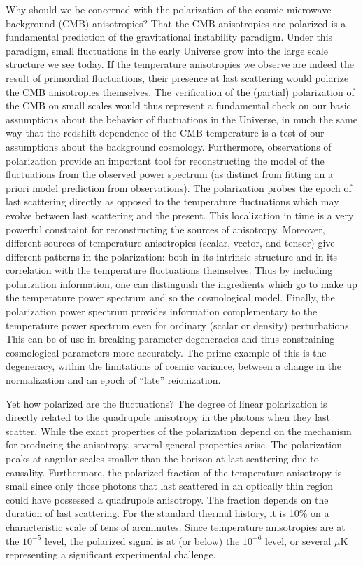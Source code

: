 \documentclass[a4paper,11pt]{article}
\begin{document}
{\noindent}Why should we be concerned with the polarization of the cosmic microwave background (CMB) anisotropies? That the CMB anisotropies are polarized is a fundamental prediction of the gravitational instability paradigm. Under this paradigm, small fluctuations in the early Universe grow into the large scale structure we see today. If the temperature anisotropies we observe are indeed the result of primordial fluctuations, their presence at last scattering would polarize the CMB anisotropies themselves. The verification of the (partial) polarization of the CMB on small scales would thus represent a fundamental check on our basic assumptions about the behavior of fluctuations in the Universe, in much the same way that the redshift dependence of the CMB temperature is a test of our assumptions about the background cosmology. Furthermore, observations of polarization provide an important tool for reconstructing the model of the fluctuations from the observed power spectrum (as distinct from fitting an a priori model prediction from observations). The polarization probes the epoch of last scattering directly as opposed to the temperature fluctuations which may evolve between last scattering and the present. This localization in time is a very powerful constraint for reconstructing the sources of anisotropy. Moreover, different sources of temperature anisotropies (scalar, vector, and tensor) give different patterns in the polarization: both in its intrinsic structure and in its correlation with the temperature fluctuations themselves. Thus by including polarization information, one can distinguish the ingredients which go to make up the temperature power spectrum and so the cosmological model. Finally, the polarization power spectrum provides information complementary to the temperature power spectrum even for ordinary (scalar or density) perturbations. This can be of use in breaking parameter degeneracies and thus constraining cosmological parameters more accurately. The prime example of this is the degeneracy, within the limitations of cosmic variance, between a change in the normalization and an epoch of ``late'' reionization.

{\noindent}Yet how polarized are the fluctuations? The degree of linear polarization is directly related to the quadrupole anisotropy in the photons when they last scatter. While the exact properties of the polarization depend on the mechanism for producing the anisotropy, several general properties arise. The polarization peaks at angular scales smaller than the horizon at last scattering due to causality. Furthermore, the polarized fraction of the temperature anisotropy is small since only those photons that last scattered in an optically thin region could have possessed a quadrupole anisotropy. The fraction depends on the duration of last scattering. For the standard thermal history, it is 10\% on a characteristic scale of tens of arcminutes. Since temperature anisotropies are at the $10^{-5}$ level, the polarized signal is at (or below) the $10^{-6}$ level, or several $\mu\mathrm{K}$ representing a significant experimental challenge.
\end{document}
